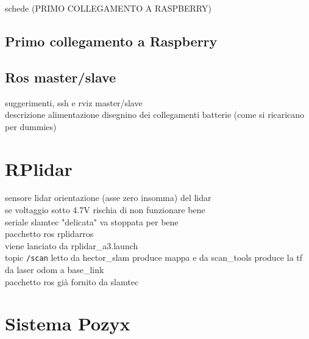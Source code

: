 schede (PRIMO COLLEGAMENTO A RASPBERRY)
\subsection{Primo collegamento a Raspberry}
\label{sez: primo collegamento a raspberry}
\subsection{Ros master/slave}
\label{sez: Ros master/slave}
suggerimenti, ssh e rviz master/slave \\
descrizione alimentazione
disegnino dei collegamenti
batterie (come si ricaricano per dummies)

\section{RPlidar}
sensore lidar 
orientazione (asse zero insomma) del lidar \\
se voltaggio sotto 4.7V rischia di non funzionare bene\\
seriale slamtec "delicata" va stoppata per bene\\
pacchetto ros rplidarros\\
viene lanciato da rplidar\_a3.launch \\
topic \texttt{/scan} letto da hector\_slam produce mappa e da scan\_tools produce la tf da laser odom a base\_link \\

pacchetto ros gi\`a fornito da slamtec

\section{Sistema Pozyx}
\label{sez:Sistema Pozyx}

